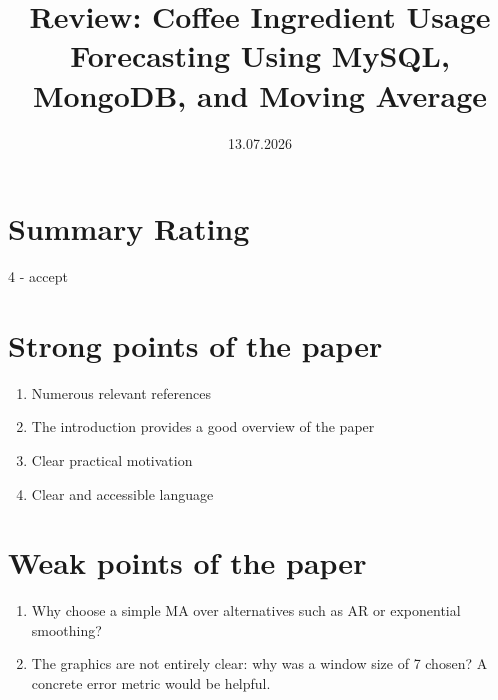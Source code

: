 \documentclass[peerreview]{IEEEtran}
\begin{document}
\title{Review: Coffee Ingredient Usage Forecasting Using
MySQL, MongoDB, and Moving Average}


\date{13.07.2026}

\maketitle

\section{Summary Rating}
4 - accept 

\section{Strong points of the paper}
\begin{enumerate}
    \item Numerous relevant references
    \item The introduction provides a good overview of the paper
    \item Clear practical motivation
    \item Clear and accessible language
\end{enumerate}

\section{Weak points of the paper}
\begin{enumerate}
    \item Why choose a simple MA over alternatives such as AR or exponential smoothing?
    \item The graphics are not entirely clear: why was a window size of 7 chosen?
          A concrete error metric would be helpful.
\end{enumerate}
\end{document}
